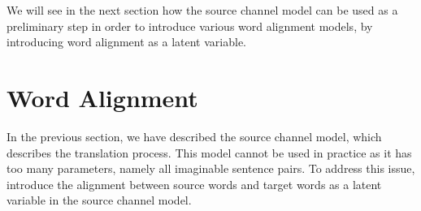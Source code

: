 We will see in the next section how the source channel model
can be used as a preliminary step in order to introduce
various word alignment models, by introducing word
alignment as a latent variable.

\section{Word Alignment}
\label{sec:StatisticalMachineTranslationWordAlignment}

In the previous section, we have described the source channel model, which
describes the translation process. This model cannot be used in
practice as it has too many parameters, namely all imaginable
sentence pairs. To address this issue,
\citet{brown-dellapietra-dellapietra-mercer-1993} introduce
the alignment between source words and target words as
a latent variable in the source channel model.

